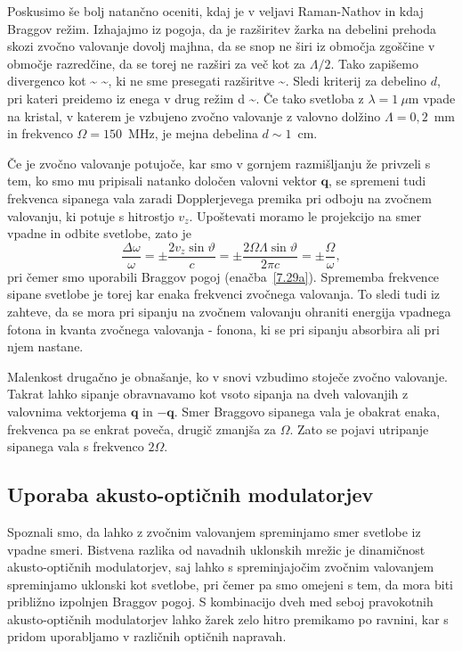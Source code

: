 \begin{remark}
 Poskusimo še bolj natančno oceniti, kdaj je v veljavi Raman-Nathov in kdaj Braggov režim. 
Izhajajmo iz pogoja, da je razširitev žarka na debelini prehoda skozi zvočno valovanje dovolj
 majhna, da se snop ne širi iz območja zgoščine v območje razredčine, da se torej ne razširi za 
 več kot za $\Lambda/2$. Tako zapišemo
 divergenco kot
 \beq
 \delta\vartheta \sim {} \sim \frac{2\lambda}{\Lambda},
 \eeq
 ki ne sme presegati razširitve
 \beq
 \delta \vartheta \sim {}.
 \eeq
Sledi kriterij za debelino $d$, pri kateri preidemo iz enega v drug režim
\beq
d \sim {}.
\eeq
Če tako svetloba z $\lambda = 1~\mu$m vpade na kristal, v katerem je vzbujeno zvočno
valovanje z valovno dolžino $\Lambda = 0,2$~mm in frekvenco $\Omega = 150$~MHz, je mejna 
debelina $d \sim 1$~cm.
\end{remark}

Če je zvočno valovanje potujoče, kar smo v gornjem razmišljanju že privzeli
s tem, ko smo mu pripisali natanko določen valovni vektor $\mathbf{q}$,
se spremeni tudi frekvenca sipanega vala zaradi Dopplerjevega premika
pri odboju na zvočnem valovanju, ki potuje s hitrostjo $v_{z}$. Upoštevati
moramo le projekcijo na smer vpadne in odbite svetlobe, zato je 
\begin{equation}
\frac{\Delta\omega}{\omega}=\pm\frac{2v_{z}\sin\vartheta}{c}=
\pm\frac{2\Omega\Lambda\sin\vartheta}{2 \pi c}=\pm\frac{\Omega}{\omega},
\label{7.32}
\end{equation}
pri čemer smo uporabili Braggov pogoj (enačba~\ref{7.29a}). Sprememba frekvence
sipane svetlobe je torej kar enaka frekvenci zvočnega valovanja. To sledi tudi
iz zahteve, da se mora pri sipanju na zvočnem valovanju ohraniti energija
vpadnega fotona in kvanta zvočnega valovanja - fonona,
ki se pri sipanju absorbira ali pri njem nastane.

Malenkost drugačno je obnašanje, ko v snovi vzbudimo stoječe zvočno valovanje. 
Takrat lahko sipanje obravnavamo kot vsoto sipanja na dveh valovanjih z valovnima 
vektorjema $\mathbf{q}$ in $-\mathbf{q}$. Smer Braggovo sipanega vala je obakrat enaka, 
frekvenca pa se enkrat poveča, drugič zmanjša za $\Omega$. Zato se pojavi utripanje
sipanega vala s frekvenco $2\Omega$.

\subsection*{Uporaba akusto-optičnih modulatorjev}
Spoznali smo, da lahko z zvočnim valovanjem spreminjamo smer svetlobe iz vpadne smeri.
Bistvena razlika od navadnih uklonskih mrežic je dinamičnost akusto-optičnih modulatorjev, 
saj lahko s spreminjajočim zvočnim valovanjem spreminjamo uklonski kot svetlobe,
pri čemer pa smo omejeni s tem, da mora biti približno izpolnjen Braggov pogoj.
S kombinacijo dveh med seboj pravokotnih akusto-optičnih modulatorjev lahko žarek zelo hitro
premikamo po ravnini, kar s pridom uporabljamo v različnih optičnih napravah. 

